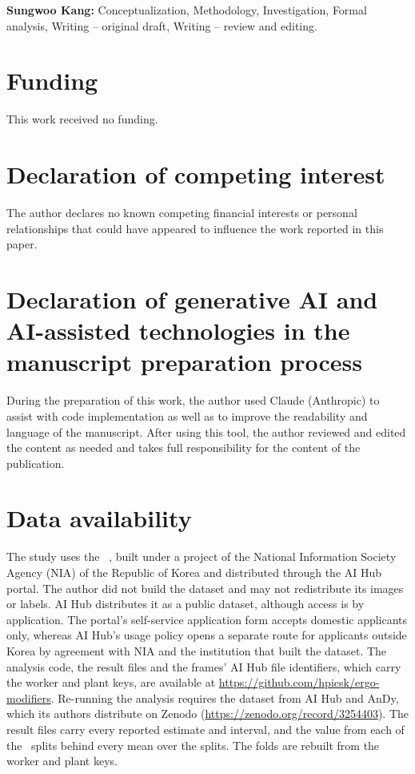 \documentclass[review,3p,authoryear]{elsarticle}
\begin{document}
\textbf{Sungwoo Kang:} Conceptualization, Methodology, Investigation, Formal analysis,
Writing -- original draft, Writing -- review and editing.

\section*{Funding}
This work received no funding.

\section*{Declaration of competing interest}
The author declares no known competing financial interests or personal relationships that
could have appeared to influence the work reported in this paper.

\section*{Declaration of generative AI and AI-assisted technologies in the manuscript
preparation process}
During the preparation of this work, the author used Claude (Anthropic) to assist with
code implementation as well as to improve the readability and language of the manuscript.
After using this tool, the author reviewed and edited the content as needed and takes full
responsibility for the content of the publication.

\section*{Data availability}
\label{sec:availability}
The study uses the \datasetName\ \citep{aihubmsk}, built under a project of the National
Information Society Agency (NIA) of the Republic of Korea and distributed through the AI
Hub portal. The author did not build the dataset and may not redistribute its images or
labels. AI Hub distributes it as a public dataset, although access is by
application. The portal's self-service application form accepts domestic applicants only,
whereas AI Hub's usage policy opens a separate route for applicants outside Korea by
agreement with NIA and the institution that built the dataset. The analysis code, the
result files and the frames' AI Hub file identifiers, which carry the worker and plant
keys, are available at \url{https://github.com/hpicsk/ergo-modifiers}. Re-running the analysis requires the dataset from AI Hub and AnDy, which its authors
distribute on Zenodo (\url{https://zenodo.org/record/3254403}). The result files carry every reported estimate
and interval, and the value from each of the \nSeeds\ splits behind every mean over the
splits. The folds are rebuilt from the worker and plant keys.
\end{document}
